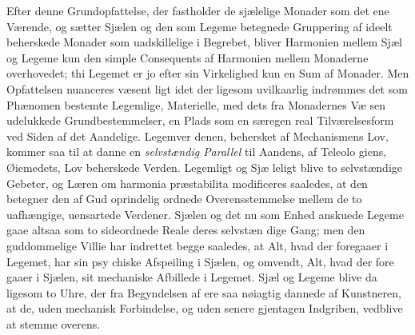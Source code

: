 \documentclass[12pt,a4paper]{book}
\begin{document}
Efter denne Grundopfattelse, der fastholder de sjælelige
Monader som det ene Værende, og sætter Sjælen og den som
Legeme betegnede Gruppering af ideelt beherskede Monader
som uadskillelige i Begrebet, bliver Harmonien mellem Sjæl
og Legeme kun den simple Consequents af Harmonien mellem
Monaderne overhovedet; thi Legemet er jo efter sin Virkelighed
kun en Sum af Monader. Men Opfattelsen nuanceres væsent\-%
ligt idet der ligesom uvilkaarlig indrømmes det som Phænomen
bestemte Legemlige, Materielle, med dets fra Monadernes Væ\-%
sen udelukkede Grundbestemmelser, en Plads som en særegen
real Tilværelsesform ved Siden af det Aandelige. Legemver\-%
denen, behersket af Mechanismens Lov, kommer saa til at
danne en \emph{selvstændig Parallel} til Aandens, af Teleolo\-%
giens, Øiemedets, Lov beherskede Verden. Legemligt og Sjæ\-%
leligt blive to selvstændige Gebeter, og Læren om harmonia
præstabilita modificeres saaledes, at den betegner den af Gud
oprindelig ordnede Overensstemmelse mellem de to uafhængige,
uensartede Verdener. Sjælen og det nu som Enhed anskuede
Legeme gaae altsaa som to sideordnede Reale deres selvstæn\-%
dige Gang; men den guddommelige Villie har indrettet begge
saaledes, at Alt, hvad der foregaaer i Legemet, har sin psy\-%
chiske Afspeiling i Sjælen, og omvendt, Alt, hvad der fore\-%
gaaer i Sjælen, sit mechaniske Afbillede i Legemet. Sjæl og
Legeme blive da ligesom to Uhre, der fra Begyndelsen af ere
saa nøiagtig dannede af Kunstneren, at de, uden mechanisk
Forbindelse, og uden senere gjentagen Indgriben, vedblive at
stemme overens.
\end{document}
